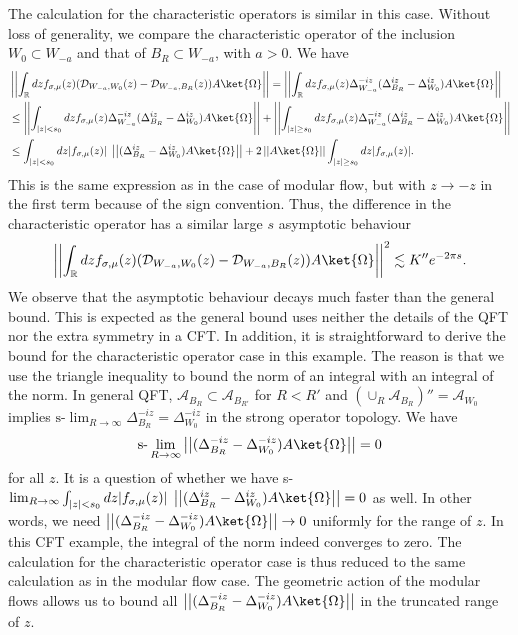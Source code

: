 \documentclass[a4paper,11pt]{article}
\theoremstyle{definition}
\begin{document}
The calculation for the characteristic operators is similar in this case. Without loss of generality, we compare the characteristic operator of the inclusion $W_0\subset W_{-a}$ and that of $B_R\subset W_{-a}$, with $a>0$. We have
\begin{align}
    &\left|\left|\int_\mathbb{R} dz f_{\sigma,\mu}(z)(\mathcal{D}_{W_{-a},W_0}(z) - \mathcal{D}_{W_{-a},B_R}(z))A\ket{\Omega}\right|\right| = \left|\left|\int_\mathbb{R} dz f_{\sigma,\mu}(z)\Delta_{W_{-a}}^{-iz}(\Delta_{B_R}^{iz} - \Delta_{W_0}^{iz})A\ket{\Omega}\right|\right| \\
    & \leq \left|\left|\int_{|z|<s_0} dz f_{\sigma,\mu}(z)\Delta_{W_{-a}}^{-iz}(\Delta_{B_R}^{iz} - \Delta_{W_0}^{iz})A\ket{\Omega}\right|\right| + \left|\left|\int_{|z|\geq s_0} dz f_{\sigma,\mu}(z)\Delta_{W_{-a}}^{-iz}(\Delta_{B_R}^{iz} - \Delta_{W_0}^{iz})A\ket{\Omega}\right|\right|\\
    &\leq \int_{|z|<s_0} dz |f_{\sigma,\mu}(z)|\;\left|\left|(\Delta_{B_R}^{iz} - \Delta_{W_0}^{iz})A\ket{\Omega}\right|\right| + 2 \left|\left|A\ket{\Omega}\right|\right|\int_{|z|\geq s_0} dz |f_{\sigma,\mu}(z)|.
\end{align}
This is the same expression as in the case of modular flow, but with $z\to-z$ in the first term because of the sign convention. Thus, the difference in the characteristic operator has a similar large $s$ asymptotic behaviour
\begin{align}
    \left|\left|\int_\mathbb{R} dz f_{\sigma,\mu}(z)(\mathcal{D}_{W_{-a},W_0}(z) - \mathcal{D}_{W_{-a},B_R}(z))A\ket{\Omega}\right|\right|^2 \lesssim K''e^{-2\pi s}.
\end{align}
We observe that the asymptotic behaviour decays much faster than the general bound. This is expected as the general bound uses neither the details of the QFT nor the extra symmetry in a CFT. In addition, it is straightforward to derive the bound for the characteristic operator case in this example. The reason is that we use the triangle inequality to bound the norm of an integral with an integral of the norm. In general QFT, $\mathcal{A}_{B_{R}} \subset \mathcal{A}_{B_{R'}}$ for $R<R'$ and $(\cup_R \mathcal{A}_{B_{R}})'' = \mathcal{A}_{W_0}$ implies $\text{s-}\lim_{R\to\infty} \Delta^{-iz}_{B_{R}} = \Delta^{-iz}_{W_0}$ in the strong operator topology. We have
\begin{align}
    \text{s-}\lim_{R\to \infty}\left|\left|(\Delta_{B_{R}}^{-iz} - \Delta_{W_0}^{-iz})A\ket{\Omega}\right|\right| = 0
\end{align}
for all $z$. It is a question of whether we have s-$\lim_{R\to\infty}\int_{|z|<s_0} dz |f_{\sigma,\mu}(z)|\;\left|\left|(\Delta_{B_R}^{iz} - \Delta_{W_0}^{iz})A\ket{\Omega}\right|\right| = 0$ as well. In other words, we need $\left|\left|(\Delta_{B_{R}}^{-iz} - \Delta_{W_0}^{-iz})A\ket{\Omega}\right|\right| \to 0$ uniformly for the range of $z$. In this CFT example, the integral of the norm indeed converges to zero. The calculation for the characteristic operator case is thus reduced to the same calculation as in the modular flow case. The geometric action of the modular flows allows us to bound all $\left|\left|(\Delta_{B_{R}}^{-iz} - \Delta_{W_0}^{-iz})A\ket{\Omega}\right|\right|$ in the truncated range of $z$.
\end{document}
